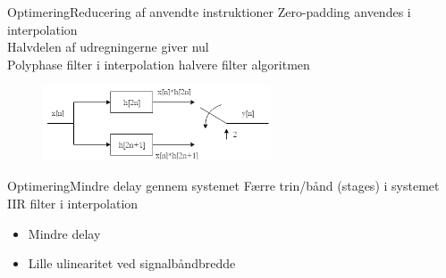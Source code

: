 \begin{frame}{Optimering}{Reducering af anvendte instruktioner}
Zero-padding anvendes i interpolation\\
\vspace{5mm}
Halvdelen af udregningerne giver nul\\
\vspace{5mm}
Polyphase filter i interpolation halvere filter algoritmen
\begin{figure}[H]
\centering
\includegraphics[width=0.6\textwidth]{polyFilter}
\end{figure}
\end{frame}

\begin{frame}{Optimering}{Mindre delay gennem systemet}
Færre trin/bånd (stages) i systemet \\
\vspace{5mm}
IIR filter i interpolation
\begin{itemize}
\item Mindre delay
\item Lille ulinearitet ved signalbåndbredde
\end{itemize}
\end{frame}

